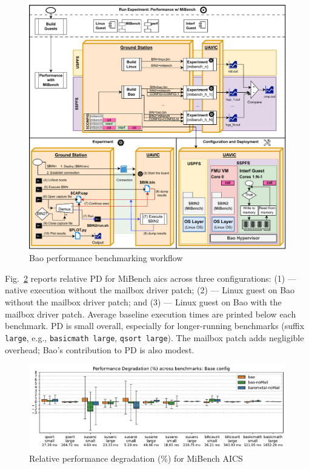 \begin{figure}[!hbt]
  \centering
  \includegraphics[width=1.0\textwidth]{./img/pdf/uav-main-eval-mibench}
  \caption{Bao performance benchmarking workflow}%
  \label{fig:uav-main-eval-mibench}
\end{figure}

Fig.~\ref{fig:plot-performDeg-Base} reports relative PD for MiBench \gls{aics} across three configurations:
(1)  — native execution without the mailbox driver patch;
(2)  — Linux guest on Bao without the mailbox driver patch; and
(3)  — Linux guest on Bao with the mailbox driver patch.
Average baseline execution times are printed below each benchmark. PD is small overall, especially for longer-running benchmarks (suffix \lstinline{large}, e.g., \lstinline{basicmath large}, \lstinline{qsort large}). The mailbox patch adds negligible overhead; Bao’s contribution to PD is also modest.

\begin{figure}[!hbt]
  \centering
  \includegraphics[width=1.0\textwidth]{./img/pdf/plot-performDeg-Base}
  \caption{Relative performance degradation (\%) for MiBench AICS}%
  \label{fig:plot-performDeg-Base}
\end{figure}

